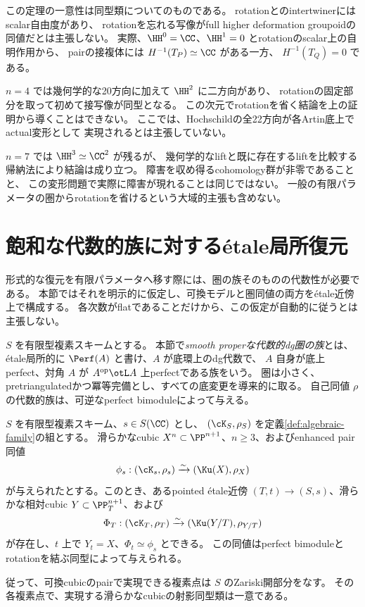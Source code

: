 \begin{remark}\label{rem:unpolarized-scope}
 この定理の一意性は同型類についてのものである。
 rotationとのintertwinerにはscalar自由度があり、
 rotationを忘れる写像がfull higher deformation groupoidの同値だとは主張しない。
 実際、\(\HH^0=\CC\)、\(\HH^1=0\) とrotationのscalar上の自明作用から、
 pairの接複体には \(H^{-1}(T_P)\simeq\CC\) がある一方、
 \(H^{-1}(T_Q)=0\) である。

 \(n=4\) では幾何学的な20方向に加えて \(\HH^2\) に二方向があり、
 rotationの固定部分を取って初めて接写像が同型となる。
 この次元でrotationを省く結論を上の証明から導くことはできない。
 ここでは、Hochschildの全22方向が各Artin底上でactual変形として
 実現されるとは主張していない。

 \(n=7\) では \(\HH^3\simeq\CC^2\) が残るが、
 幾何学的なliftと既に存在するliftを比較する帰納法により結論は成り立つ。
 障害を収め得るcohomology群が非零であることと、
 この変形問題で実際に障害が現れることは同じではない。
 一般の有限パラメータの圏からrotationを省けるという大域的主張も含めない。
\end{remark}

\section{飽和な代数的族に対するétale局所復元}\label{sec:algebraization}

形式的な復元を有限パラメータへ移す際には、圏の族そのものの代数性が必要である。
本節ではそれを明示的に仮定し、可換モデルと圏同値の両方をétale近傍上で構成する。
各次数がflatであることだけから、この仮定が自動的に従うとは主張しない。

\begin{definition}\label{def:algebraic-family}
 \(S\) を有限型複素スキームとする。
 本節で\emph{smooth properな代数的dg圏の族}とは、
 étale局所的に \(\Perf(A)\) と書け、\(A\) が底環上のdg代数で、
 \(A\) 自身が底上perfect、対角 \(A\) が \(A^{\mathrm{op}}\otL A\) 上perfectである族をいう。
 圏は小さく、pretriangulatedかつ冪等完備とし、すべての底変更を導来的に取る。
 自己同値 \(\rho\) の代数的族は、可逆なperfect bimoduleによって与える。
\end{definition}

\begin{theorem}[étale局所的な可換復元]\label{thm:etale}
 \(S\) を有限型複素スキーム、\(s\in S(\CC)\) とし、
 \((\cK_S,\rho_S)\) を定義\ref{def:algebraic-family}の組とする。
 滑らかなcubic \(X^n\subset\PP^{n+1}\)、\(n\ge3\)、およびenhanced pair同値
 \[
 \phi_s:(\cK_s,\rho_s)\xrightarrow{\sim}(\Ku(X),\rho_X)
 \]
 が与えられたとする。このとき、あるpointed étale近傍
 \((T,t)\to(S,s)\)、滑らかな相対cubic \(Y\subset\PP^{n+1}_T\)、および
 \[
 \Phi_T:(\cK_T,\rho_T)\xrightarrow{\sim}(\Ku(Y/T),\rho_{Y/T})
 \]
 が存在し、\(t\) 上で \(Y_t=X\)、\(\Phi_t\simeq\phi_s\) とできる。
 この同値はperfect bimoduleとrotationを結ぶ同型によって与えられる。

 従って、可換cubicのpairで実現できる複素点は \(S\) のZariski開部分をなす。
 その各複素点で、実現する滑らかなcubicの射影同型類は一意である。
\end{theorem}

